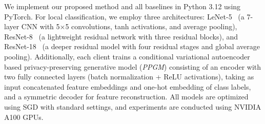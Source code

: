 \documentclass[lettersize,journal]{IEEEtran}
\begin{document}
We implement our proposed method and all baselines in Python 3.12 using PyTorch. For local classification, we employ three architectures: LeNet-5~\cite{lenet5} (a 7-layer CNN with 5$\times$5 convolutions, tanh activations, and average pooling), ResNet-8~\cite{resnet} (a lightweight residual network with three residual blocks), and ResNet-18~\cite{resnet} (a deeper residual model with four residual stages and global average pooling). Additionally, each client trains a conditional variational autoencoder based privacy-preserving generative model (\emph{PPGM}) consisting of an encoder with two fully connected layers (batch normalization + ReLU activations), taking as input concatenated feature embeddings and one-hot embedding of class labels, and a symmetric decoder for feature reconstruction. All models are optimized using SGD with standard settings, and experiments are conducted using NVIDIA A100 GPUs.
\end{document}
